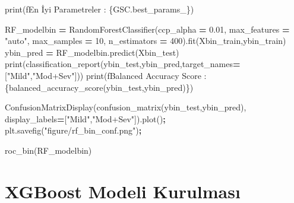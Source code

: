 \documentclass[12pt,twoside]{deuthesis}
\newenvironment{Shaded}{\begin{snugshade}}{\end{snugshade}}
\newcommand{\BuiltInTok}[1]{#1}
\newcommand{\DecValTok}[1]{\textcolor[rgb]{0.00,0.00,0.81}{#1}}
\newcommand{\FloatTok}[1]{\textcolor[rgb]{0.00,0.00,0.81}{#1}}
\newcommand{\NormalTok}[1]{#1}
\newcommand{\OperatorTok}[1]{\textcolor[rgb]{0.81,0.36,0.00}{\textbf{#1}}}
\newcommand{\SpecialCharTok}[1]{\textcolor[rgb]{0.00,0.00,0.00}{#1}}
\newcommand{\SpecialStringTok}[1]{\textcolor[rgb]{0.31,0.60,0.02}{#1}}
\newcommand{\StringTok}[1]{\textcolor[rgb]{0.31,0.60,0.02}{#1}}
\begin{document}
\begin{Shaded}
\begin{Highlighting}[]
\BuiltInTok{print}\NormalTok{(}\SpecialStringTok{f\textquotesingle{}En İyi Parametreler : }\SpecialCharTok{\{}\NormalTok{GSC}\SpecialCharTok{.}\NormalTok{best\_params\_}\SpecialCharTok{\}}\SpecialStringTok{\textquotesingle{}}\NormalTok{)}
\end{Highlighting}
\end{Shaded}
\begin{Shaded}
\begin{Highlighting}[]
\NormalTok{RF\_modelbin }\OperatorTok{=}\NormalTok{ RandomForestClassifier(ccp\_alpha }\OperatorTok{=} \FloatTok{0.01}\NormalTok{, }
\NormalTok{                                     max\_features }\OperatorTok{=} \StringTok{"auto"}\NormalTok{,}
\NormalTok{                                     max\_samples }\OperatorTok{=} \DecValTok{10}\NormalTok{,}
\NormalTok{                                     n\_estimators }\OperatorTok{=} \DecValTok{400}\NormalTok{).fit(Xbin\_train,ybin\_train)}
\NormalTok{ybin\_pred }\OperatorTok{=}\NormalTok{ RF\_modelbin.predict(Xbin\_test)}
\BuiltInTok{print}\NormalTok{(classification\_report(ybin\_test,ybin\_pred,target\_names}\OperatorTok{=}\NormalTok{[}\StringTok{"Mild"}\NormalTok{,}\StringTok{"Mod+Sev"}\NormalTok{]))}
\BuiltInTok{print}\NormalTok{(}\SpecialStringTok{f\textquotesingle{}Balanced Accuracy Score : }\SpecialCharTok{\{}\NormalTok{balanced\_accuracy\_score(ybin\_test,ybin\_pred)}\SpecialCharTok{\}}\SpecialStringTok{\textquotesingle{}}\NormalTok{)}
\end{Highlighting}
\end{Shaded}
\begin{Shaded}
\begin{Highlighting}[]
\NormalTok{ConfusionMatrixDisplay(confusion\_matrix(ybin\_test,ybin\_pred),}
\NormalTok{                       display\_labels}\OperatorTok{=}\NormalTok{[}\StringTok{"Mild"}\NormalTok{,}\StringTok{"Mod+Sev"}\NormalTok{]).plot()}\OperatorTok{;}
\NormalTok{plt.savefig(}\StringTok{"figure/rf\_bin\_conf.png"}\NormalTok{)}\OperatorTok{;}
\end{Highlighting}
\end{Shaded}
\begin{Shaded}
\begin{Highlighting}[]
\NormalTok{roc\_bin(RF\_modelbin)}
\end{Highlighting}
\end{Shaded}
\normalsize

\hypertarget{xgboost-modeli-kurulmasux131-1}{%
\section{XGBoost Modeli Kurulması}\label{xgboost-modeli-kurulmasux131-1}}
\end{document}
